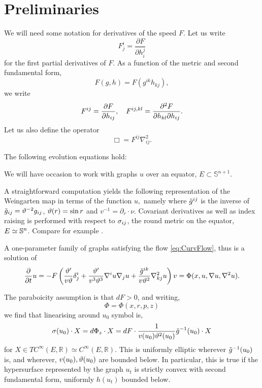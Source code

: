 \documentclass{amsart}
\begin{document}
\section{Preliminaries}
\label{sec:prelim}

We will need some notation for derivatives of the speed \(F\). Let us write
\[
F^{i}_{j} = \frac{\partial F}{\partial h^{j}_{i}}
\]
for the first partial derivatives of \(F\). As a function of the metric and second fundamental form,
\[
F(g, h) = F(g^{ik} h_{kj}),
\]
we write
\[
F^{ij} = \frac{\partial F}{\partial h_{ij}}, \quad F^{ij,kl} = \fr{\partial^2F}{\partial h_{kl} \partial h_{ij}}.
\]
Let us also define the operator
\[
\Box = F^{ij} \nabla^2_{ij}.
\]
\begin{lemma} \label{lem: basi ev}
The following evolution equations hold:
\end{lemma}

We will have occasion to work with graphs \(u\) over an equator, \(E \subset \mathbb{S}^{n+1}\).

A straightforward computation yields the following representation of the Weingarten map in terms of the function $u,$ namely
where $\~g^{ij}$ is the inverse of $\~g_{ij}=\vt^{-2}g_{ij}$, $\vt(r)=\sin r$ and \(v^{-1} = \partial_r \cdot \nu\). Covariant derivatives as well as index raising is performed with respect to $\s_{ij}$, the round metric on the equator, \(E \simeq \S^n\). Compare for example \cite[(3.82)]{Scheuer:05/2015}.

A one-parameter family of graphs satisfying the flow \eqref{eq:CurvFlow}, thus is a solution of
\begin{equation}
\label{eq:GraphCurvFlow}
\fr{\del}{\del t}u=-F\br{\fr{\vt'}{v\vt}\d^{i}_{j}+\fr{\vt'}{v^{3}\vt^{3}}\nabla^{i}u\nabla_{j}u+\fr{\~g^{ik}}{v\vt^{2}}\nabla^{2}_{kj}u}v=\Phi(x,u,\nabla u,\nabla^{2}u).
\end{equation}

The paraboicity assumption is that \(dF > 0\), and writing,
\[
\Phi = \Phi(x, r, p, z)
\]
we find that linearising around \(u_0\) symbol is,
\[
\sigma(u_0) \cdot X = d\Phi_z \cdot X = dF \cdot \fr{1}{v(u_0) \vt^{2}(u_0)} \~g^{-1}(u_0) \cdot X
\]
for \(X \in TC^{\infty}(E, \mathbb{R}) \simeq C^{\infty}(E, \mathbb{R})\). This is uniformly elliptic wherever \(\~g^{-1}(u_0)\) is, and wherever, \(v(u_0), \vt(u_0)\) are bounded below. In particular, this is true if the hypersurface represented by the graph \(u_t\) is strictly convex with second fundamental form, uniformly \(h(u_t)\) bounded below.
\end{document}
